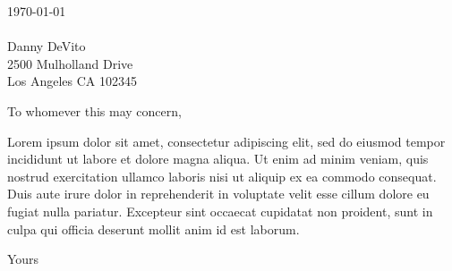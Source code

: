 \documentclass[myletter, a4paper, 11pt]{scrlttr2}
\begin{document}
\begin{letter}{\today \\ \hfill \\ Danny DeVito \\2500 Mulholland Drive \\Los Angeles CA 102345}

\opening{To whomever this may concern,}

Lorem ipsum dolor sit amet, consectetur adipiscing elit, sed do eiusmod tempor incididunt ut labore et dolore magna aliqua. Ut enim ad minim veniam, quis nostrud exercitation ullamco laboris nisi ut aliquip ex ea commodo consequat. Duis aute irure dolor in reprehenderit in voluptate velit esse cillum dolore eu fugiat nulla pariatur. Excepteur sint occaecat cupidatat non proident, sunt in culpa qui officia deserunt mollit anim id est laborum.


\closing{Yours}


\end{letter}
\end{document}
